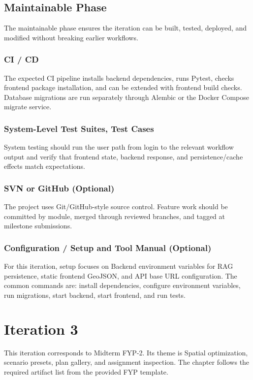 \documentclass[12pt,a4paper,oneside]{report}
\begin{document}
\section{Maintainable Phase}
The maintainable phase ensures the iteration can be built, tested, deployed, and modified without breaking earlier workflows.

\subsection{CI / CD}
The expected CI pipeline installs backend dependencies, runs Pytest, checks frontend package installation, and can be extended with frontend build checks. Database migrations are run separately through Alembic or the Docker Compose migrate service.

\subsection{System-Level Test Suites, Test Cases}
System testing should run the user path from login to the relevant workflow output and verify that frontend state, backend response, and persistence/cache effects match expectations.

\subsection{SVN or GitHub (Optional)}
The project uses Git/GitHub-style source control. Feature work should be committed by module, merged through reviewed branches, and tagged at milestone submissions.

\subsection{Configuration / Setup and Tool Manual (Optional)}
For this iteration, setup focuses on Backend environment variables for RAG persistence, static frontend GeoJSON, and API base URL configuration. The common commands are: install dependencies, configure environment variables, run migrations, start backend, start frontend, and run tests.

\chapter{Iteration 3}
This iteration corresponds to Midterm FYP-2. Its theme is Spatial optimization, scenario presets, plan gallery, and assignment inspection. The chapter follows the required artifact list from the provided FYP template.
\end{document}
